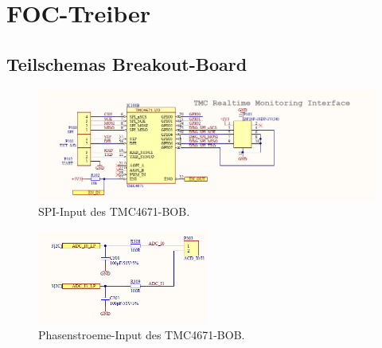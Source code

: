 \section{FOC-Treiber}\label{Appendix:TMC4671}

%

\subsection{Teilschemas Breakout-Board}\label{Appendix:BOB}

\begin{figure}[H]
	\centering
	\includegraphics[width=\textwidth]{graphics/TMC4671_SPI_BOB_Schematic}
	\caption{SPI-Input des TMC4671-BOB. \cite[S.2]{trinamicmotion_control_gmbh__co_kg_tmc4671-bob_2020}}
	\label{fig:Schema_SPI_FOC_Treiber}
\end{figure} 

\begin{figure}[H]
	\centering
	\includegraphics[width=0.5\textwidth]{graphics/TMC4671_Phasenstroeme_BOB_Schematic}
	\caption{Phasenstroeme-Input des TMC4671-BOB. \cite[S.4]{trinamicmotion_control_gmbh__co_kg_tmc4671-bob_2020}}
	\label{fig:Schema_Phasenstroeme_FOC_Treiber}
\end{figure} 

